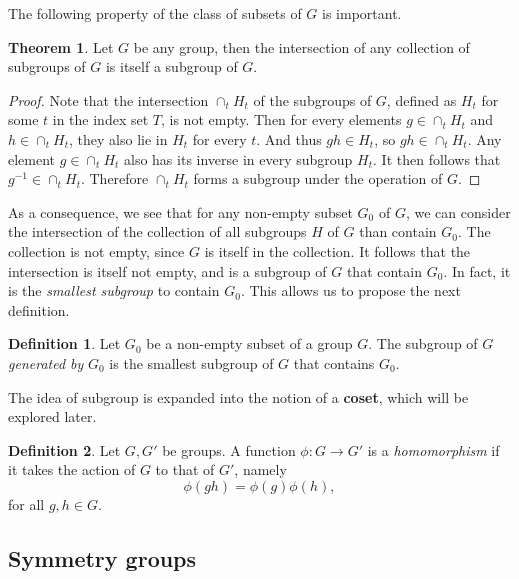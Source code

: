 \documentclass[12pt]{book}
\newcommand{\ra}{\rightarrow}
\theoremstyle{definition}
\newtheorem{definition}{Definition}[section]
\newtheorem{theorem}{Theorem}[chapter]
\theoremstyle{remark}
\begin{document}
			The following property of the class of subsets of $G$ is important.
		\begin{theorem}
			Let $G$ be any group, then the intersection of any collection of subgroups of $G$ is itself a subgroup of $G$.
		\end{theorem}
			\begin{proof}
				Note that the intersection $\cap_t H_t$ of the subgroups of $G$, defined as $H_t$ for some $t$ in the index set $T$, is not empty. Then for every elements $g \in \cap_t H_t$ and $h \in \cap_t H_t$, they also lie in $H_t$ for every $t$. And thus $gh \in H_t$, so $gh \in \cap_t H_t$. Any element $g \in \cap_t H_t$ also has its inverse in every subgroup $H_t$. It then follows that $g^{-1} \in \cap_t H_t$. Therefore $\cap_t H_t$ forms a subgroup under the operation of $G$.
			\end{proof}
		
			As a consequence, we see that for any non-empty subset $G_0$ of $G$, we can consider the intersection of the collection of all subgroups $H$ of $G$ than contain $G_0$. The collection is not empty, since $G$ is itself in the collection. It follows that the intersection is itself not empty, and is a subgroup of $G$ that contain $G_0$. In fact, it is the \textit{smallest subgroup} to contain $G_0$. This allows us to propose the next definition.
			
			\begin{definition}
				Let $G_0$ be a non-empty subset of a group $G$. The subgroup of $G$ \textit{generated by} $G_0$ is the smallest subgroup of $G$ that contains $G_0$.
			\end{definition}
			
			The idea of subgroup is expanded into the notion of a \textbf{coset}, which will be explored later.
		\begin{definition}
			Let $G, G'$ be groups. A function $\phi \colon G \ra G'$ is a \textit{homomorphism} if it takes the action of $G$ to that of $G'$, namely
			\begin{equation*}
					\phi(gh) = \phi(g)\phi(h),
			\end{equation*}
			for all $g, h \in G$.
		\end{definition}
			
			
	\subsection{Symmetry groups}
		
\end{document}
